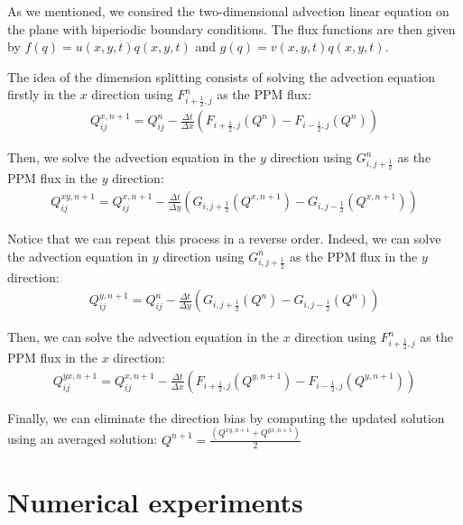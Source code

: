 As we mentioned, we consired the two-dimensional advection linear equation on the plane
with biperiodic boundary conditions. The flux functions are then given by
$f(q) = u(x,y,t)q(x,y,t)$ and  $g(q) = v(x,y,t)q(x,y,t)$.

The idea of the dimension splitting consists of solving the advection equation firstly in the $x$
direction using ${F}_{i+\frac{1}{2},j}^{n}$ as the PPM flux:
\begin{align}
	{Q}_{ij}^{x,n+1} =  {Q}_{ij}^{n} -
	\frac{\Delta t}{\Delta x} ({F}_{i+\frac{1}{2},j}({Q}^{n}) - {F}_{i-\frac{1}{2},j}({Q}^{n}))
\end{align}

Then, we solve the advection equation in the $y$ direction using ${G}_{i,j+\frac{1}{2}}^{n}$ 
as the PPM flux in the $y$ direction:
\begin{align*}
	{Q}_{ij}^{xy,n+1} =  {Q}_{ij}^{x,n+1} -
	\frac{\Delta t}{\Delta y} ({G}_{i,j+\frac{1}{2}}({Q}^{x,n+1}) - {G}_{i,j-\frac{1}{2}}({Q}^{x,n+1}))
\end{align*}

Notice that we can repeat this process in a reverse order.
Indeed, we can solve the advection equation in $y$ direction using ${G}_{i,j+\frac{1}{2}}^{n}$ 
as the PPM flux in the $y$ direction:
\begin{align*}
	{Q}_{ij}^{y,n+1} =  {Q}_{ij}^{n} -
	\frac{\Delta t}{\Delta y} ({G}_{i,j+\frac{1}{2}}({Q}^{n}) - {G}_{i,j-\frac{1}{2}}({Q}^{n}))
\end{align*}

Then, we can solve the advection equation in the $x$ direction using
${F}_{i+\frac{1}{2},j}^{n}$ as the PPM flux in the $x$ direction:
\begin{align*}
	{Q}_{ij}^{yx,n+1} =  {Q}_{ij}^{x,n+1} -
	\frac{\Delta t}{\Delta x} ({F}_{i+\frac{1}{2},j}({Q}^{y,n+1}) - {F}_{i-\frac{1}{2},j}({Q}^{y,n+1}))
\end{align*}

Finally, we can eliminate the direction bias by computing the updated solution
using an averaged solution:
$ Q^{n+1} = \frac{(Q^{xy,n+1} + Q^{yx,n+1})}{2}$

\section{Numerical experiments}
\label{sec-ds-exp}

